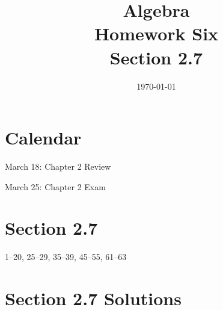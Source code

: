 \documentclass[letterpaper]{exam}
\title{Algebra \\ Homework Six \\ Section 2.7 }
\author{}
\date{\today}
\begin{document}
  \maketitle

  \section{Calendar}

  \begin{itemize*}
    \item March 18: Chapter 2 Review
    \item March 25: Chapter 2 Exam
  \end{itemize*}

  \section{Section 2.7}
  1--20, 25--29, 35--39, 45--55, 61--63


  \ifprintanswers{}

    \section{Section 2.7 Solutions} 
\end{document}
